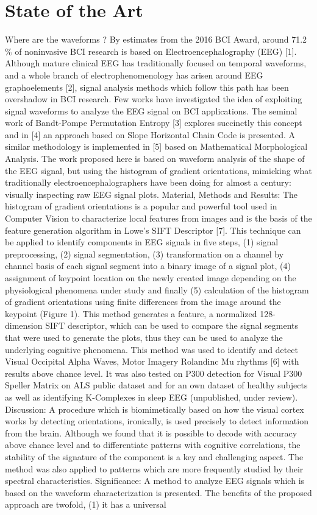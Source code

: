 \chapter{State of the Art}

Where are the waveforms ? By estimates from the 2016 BCI Award, around 71.2$\%$ of noninvasive BCI research is based on Electroencephalography (EEG) [1]. Although mature clinical EEG has traditionally focused on temporal waveforms, and a whole branch of electrophenomenology has arisen around EEG graphoelements [2], signal analysis methods which follow this path has been overshadow in BCI research. Few works have investigated the idea of exploiting signal waveforms to analyze the EEG signal on BCI applications. The seminal work of Bandt-Pompe Permutation Entropy [3] explores succinctly this concept and in [4] an approach based on Slope Horizontal Chain Code is presented. A similar methodology is implemented in [5] based on Mathematical Morphological Analysis. The work proposed here is based on waveform analysis of the shape of the EEG signal, but using the histogram of gradient orientations, mimicking what traditionally electroencephalographers have been doing for almost a century: visually inspecting raw EEG signal plots. Material, Methods and Results: The histogram of gradient orientations is a popular and powerful tool used in Computer Vision to characterize local features from images and is the basis of the feature generation algorithm in Lowe's SIFT Descriptor [7]. This technique can be applied to identify components in EEG signals in five steps, (1) signal preprocessing, (2) signal segmentation, (3) transformation on a channel by channel basis of each signal segment into a binary image of a signal plot, (4) assignment of keypoint location on the newly created image depending on the physiological phenomena under study and finally (5) calculation of the histogram of gradient orientations using finite differences from the image around the keypoint (Figure 1). This method generates a feature, a normalized 128-dimension SIFT descriptor, which can be used to compare the signal segments that were used to generate the plots, thus they can be used to analyze the underlying cognitive phenomena. This method was used to identify and detect Visual Occipital Alpha Waves, Motor Imagery Rolandinc Mu rhythms [6] with results above chance level. It was also tested on P300 detection for Visual P300 Speller Matrix on ALS public dataset and for an own dataset of healthy subjects as well as identifying K-Complexes in sleep EEG (unpublished, under review). Discussion: A procedure which is biomimetically based on how the visual cortex works by detecting orientations, ironically, is used precisely to detect information from the brain. Although we found that it is possible to decode with accuracy above chance level and to differentiate patterns with cognitive correlations, the stability of the signature of the component is a key and challenging aspect. The method was also applied to patterns which are more frequently studied by their spectral characteristics. Significance: A method to analyze EEG signals which is based on the waveform characterization is presented. The benefits of the proposed approach are twofold, (1) it has a universal 